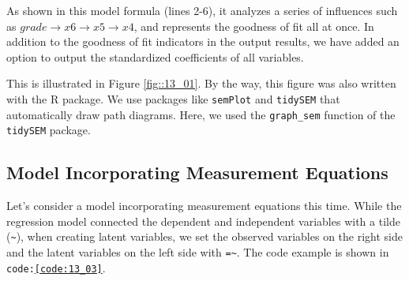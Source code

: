 \documentclass{ltjsbook}
\begin{document}


As shown in this model formula (lines 2-6), it analyzes a series of influences such as $grade \to x6 \to x5 \to x4$, and represents the goodness of fit all at once. In addition to the goodness of fit indicators in the output results, we have added an option to output the standardized coefficients of all variables.

This is illustrated in Figure \ref{fig::13_01}. By the way, this figure was also written with the R package. We use packages like \texttt{semPlot} \parencite{Charles2013}and \texttt{tidySEM} \parencite{tidySEM} that automatically draw path diagrams. Here, we used the \verb|graph_sem| function of the \texttt{tidySEM} package.



\subsection{Model Incorporating Measurement Equations}
Let's consider a model incorporating measurement equations this time. While the regression model connected the dependent and independent variables with a tilde (\verb|~|), when creating latent variables, we set the observed variables on the right side and the latent variables on the left side with \verb|=~|.
The code example is shown in \texttt{code:\ref{code:13_03}}.


\end{document}
